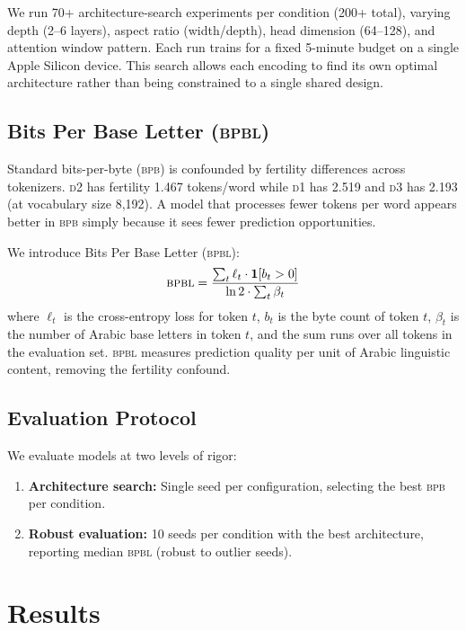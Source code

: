 \documentclass[11pt]{article}
\newcommand{\dOne}{\textsc{d1}}
\newcommand{\dTwo}{\textsc{d2}}
\newcommand{\dThree}{\textsc{d3}}
\newcommand{\bpbl}{\textsc{bpbl}}
\newcommand{\bpb}{\textsc{bpb}}
\begin{document}
We run 70+ architecture-search experiments per condition (200+ total), varying depth (2--6 layers), aspect ratio (width/depth), head dimension (64--128), and attention window pattern.
Each run trains for a fixed 5-minute budget on a single Apple Silicon device.
This search allows each encoding to find its own optimal architecture rather than being constrained to a single shared design.

\subsection{Bits Per Base Letter (\bpbl{})}
\label{sec:bpbl}

Standard bits-per-byte (\bpb{}) is confounded by fertility differences across tokenizers.
\dTwo{} has fertility 1.467 tokens/word while \dOne{} has 2.519 and \dThree{} has 2.193 (at vocabulary size 8,192).
A model that processes fewer tokens per word appears better in \bpb{} simply because it sees fewer prediction opportunities.

We introduce Bits Per Base Letter (\bpbl{}):
\begin{equation}
\text{\bpbl{}} = \frac{\sum_{t} \ell_t \cdot \mathbf{1}[b_t > 0]}{\ln 2 \cdot \sum_{t} \beta_t}
\label{eq:bpbl}
\end{equation}
where $\ell_t$ is the cross-entropy loss for token $t$, $b_t$ is the byte count of token $t$, $\beta_t$ is the number of Arabic base letters in token $t$, and the sum runs over all tokens in the evaluation set.
\bpbl{} measures prediction quality per unit of Arabic linguistic content, removing the fertility confound.

\subsection{Evaluation Protocol}

We evaluate models at two levels of rigor:
\begin{enumerate}
\item \textbf{Architecture search:} Single seed per configuration, selecting the best \bpb{} per condition.
\item \textbf{Robust evaluation:} 10 seeds per condition with the best architecture, reporting median \bpbl{} (robust to outlier seeds).
\end{enumerate}

\section{Results}
\label{sec:results}
\end{document}
